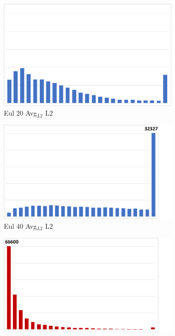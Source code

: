 \begin{figure}
\begin{subfigure}{0.195\textwidth}
\centering
\includegraphics[width=0.9\linewidth]{results/cloverleaf3d/eul_1/Eul1_AvgL2.pdf}
\vspace{-2mm}
\caption{Eul 20 Avg$_{L2}$ L2 }
\end{subfigure}
\begin{subfigure}{0.195\textwidth}
\centering
\includegraphics[width=0.95\linewidth]{results/cloverleaf3d/eul_2/Eul2_AvgL2.pdf}
\vspace{-2mm}
\caption{Eul 40 Avg$_{L2}$ L2 }
\end{subfigure}
\begin{subfigure}{0.195\textwidth}
\centering
\includegraphics[width=0.9\linewidth, trim={0cm 0cm 2.5cm 0cm}, clip]{results/cloverleaf3d/lag_4/Lag4_AvgL2.pdf}

\end{subfigure}
\end{figure}
